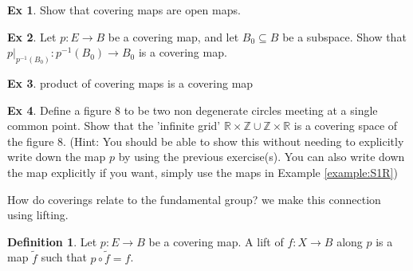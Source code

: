 \documentclass[10pt, openany]{book}
\newcommand{\bb}[1]{\mathbb{#1}}
\theoremstyle{plain}
\theoremstyle{definition}
\newtheorem{definition}[theorem]{Definition}
\newtheorem{exercise}{Ex}[section]
\theoremstyle{remark}
\begin{document}
\begin{exercise}
  Show that covering maps are open maps.
\end{exercise}
\begin{exercise}
  Let $p: E\rightarrow B$ be a covering map, and let $B_0\subseteq B$ be a subspace. Show that $p|_{p^{-1}(B_0)}:p^{-1}(B_0)\rightarrow B_0$ is a covering map.
\end{exercise}
\begin{exercise}
  product of covering maps is a covering map
\end{exercise}
\begin{exercise}
  Define a figure 8 to be two non degenerate circles meeting at a single common point. Show that the 'infinite grid' $\bb R\times \bb Z\cup \bb Z\times \bb R$ is a covering space of the figure 8. (Hint: You should be able to show this without needing to explicitly write down the map $p$ by using the previous exercise(s). You can also write down the map explicitly if you want, simply use the maps in Example \ref{example:S1R})
\end{exercise}

How do coverings relate to the fundamental group? we make this connection using lifting.
\begin{definition}
  Let $p:E\rightarrow B$ be a covering map. A lift of $f: X\rightarrow B$ along $p$ is a map $\tilde{f}$ such that $p\circ \tilde{f} = f$.
\end{definition}
\end{document}

